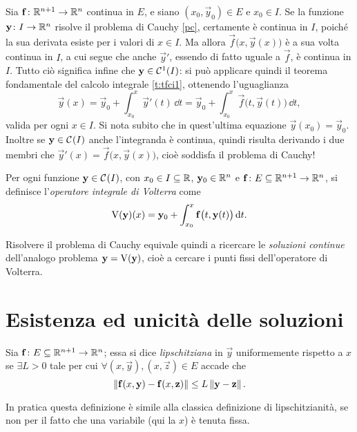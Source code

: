 Sia $\mathbf{f}\colon\mathbb{R}^{n+1}\to\mathbb{R}^n$ continua in $E$, e siano $(x_0,\vec y_0)\in E$ e $x_0\in I$. Se la funzione $\mathbf{y}\colon I\to\mathbb{R}^n$ risolve il problema di Cauchy \eqref{pc}, certamente è continua in $I$, poiché la sua derivata esiste per i valori di $x\in I$. Ma allora $\vec f\big(x,\vec y(x)\big)$ è a sua volta continua in $I$, a cui segue che anche $\vec y'$, essendo di fatto uguale a $\vec f$, è continua in $I$. Tutto ciò significa infine che $\mathbf{y}\in\mathcal{C}^{{1}}(I)$: si può applicare quindi il teorema fondamentale del calcolo integrale \ref{t:tfci1}, ottenendo l'uguaglianza
\begin{equation}
\vec y(x)=\vec y_0+\int_{x_0}^x\vec y'(t)\,\dd t=\vec y_0+\int_{x_0}^x\vec f\big(t,\vec y(t)\big)\,\dd t,
\end{equation}
valida per ogni $x\in I$.
Si nota subito che in quest'ultima equazione $\vec y(x_0)=\vec y_0$. Inoltre se $\mathbf{y}\in\mathcal{C}^{{}}(I)$ anche l'integranda è continua, quindi risulta derivando i due membri che $\vec y'(x)=\vec f\big(x,\vec y(x)\big)$, cioè soddisfa il problema di Cauchy!

\begin{definizione} \label{d:volterra}
Per ogni funzione $\mathbf{y}\in\mathcal{C}^{{}}(I)$, con $x_0\in I\subseteq\mathbb{R}$, $\mathbf{y}_0\in\mathbb{R}^n$ e $\mathbf{f}\colon E\subseteq\mathbb{R}^{n+1}\to\mathbb{R}^n$, si definisce l'\emph{operatore integrale di Volterra} come
\begin{equation} \label{vol}
\operatorname{V}(\mathbf{y})(x)=\mathbf{y}_0+\int_{x_0}^x\mathbf{f}\big(t,\mathbf{y}(t)\big)\,\textup{d} t.
\end{equation}
\end{definizione}
Risolvere il problema di Cauchy equivale quindi a ricercare le \emph{soluzioni continue} dell'analogo problema $\mathbf{y}=\operatorname{V}(\mathbf{y})$, cioè a cercare i punti fissi dell'operatore di Volterra.

\section{Esistenza ed unicità delle soluzioni}
\begin{definizione} \label{d:lipschitziana-uniformemente}
	Sia $\mathbf{f}\colon E\subseteq\mathbb{R}^{n+1}\to\mathbb{R}^n$; essa si dice \emph{lipschitziana} in $\vec y$ uniformemente rispetto a $x$ se $\exists L>0$ tale per cui $\forall(x,\vec y),(x,\vec z)\in E$ accade che
	\begin{equation}
		\left\|{\mathbf{f}(x,\mathbf{y})-\mathbf{f}(x,\mathbf{z})}\right\|\leq L\left\|{\mathbf{y}-\mathbf{z}}\right\|.
	\end{equation}
\end{definizione}
In pratica questa definizione è simile alla classica definizione di lipschitzianità, se non per il fatto che una variabile (qui la $x$) è tenuta fissa.
